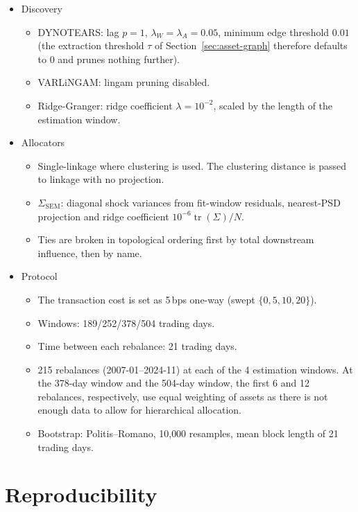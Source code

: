 \documentclass[11pt, a4paper]{report}
\begin{document}
\begin{itemize}
  \item Discovery
  \begin{itemize}
    \item DYNOTEARS: lag $p=1$, $\lambda_W=\lambda_A=0.05$, minimum edge threshold $0.01$ (the extraction threshold $\tau$ of
      Section~\ref{sec:asset-graph} therefore defaults to $0$ and prunes
      nothing further).
    \item VARLiNGAM: lingam pruning disabled.
    \item Ridge-Granger: ridge coefficient $\lambda=10^{-2}$, scaled by the length of the estimation window.
  \end{itemize}
  \item Allocators
  \begin{itemize}
    \item Single-linkage where clustering is used. The clustering
      distance is passed to linkage with no projection.
    \item $\Sigma_{\mathrm{SEM}}$: diagonal shock variances from fit-window
      residuals, nearest-PSD projection and ridge coefficient
      $10^{-6}\operatorname{tr}(\Sigma)/N$.
    \item Ties are broken in topological ordering first by total downstream influence, then by name.
  \end{itemize}
  \item Protocol
  \begin{itemize}
    \item The transaction cost is set as 5\,bps one-way (swept $\{0,5,10,20\}$).
    \item Windows: 189/252/378/504 trading days.
    \item Time between each rebalance: 21 trading days.
    \item 215 rebalances (2007-01--2024-11) at each of the 4 estimation windows. At the 378-day window and the 504-day window, the first 6 and 12 rebalances, respectively, use equal weighting of assets as there is not enough data to allow for hierarchical allocation.
    \item Bootstrap: Politis--Romano, 10{,}000 resamples, mean block length of
      21 trading days.
  \end{itemize}
\end{itemize}

\section{Reproducibility}
\end{document}
